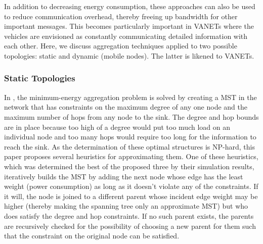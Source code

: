 \documentclass{IEEEtran}
\begin{document}
In addition to decreasing energy consumption, these approaches can also be used to reduce communication overhead, thereby freeing up bandwidth for other important messages.
This becomes particularly important in VANETs where the vehicles are envisioned as constantly communicating detailed information with each other.
Here, we discuss aggregation techniques applied to two possible topologies: static and dynamic (mobile nodes).  The latter is likened to VANETs.

\subsubsection{Static Topologies}

In \cite{heuristic}, the minimum-energy aggregation problem is solved by creating a MST in the network that has constraints on the maximum degree of any one node and the maximum number of hops from any node to the sink.  The degree and hop bounds are in place because too high of a degree would put too much load on an individual node and too many hops would require too long for the information to reach the sink.  As the determination of these optimal structures is NP-hard, this paper proposes several heuristics for approximating them.  One of these heuristics, which was determined the best of the proposed three by their simulation results, iteratively builds the MST by adding the next node whose edge has the least weight (power consumption) as long as it doesn’t violate any of the constraints.  If it will, the node is joined to a different parent whose incident edge weight may be higher (thereby making the spanning tree only an approximate MST) but who does satisfy the degree and hop constraints.  If no such parent exists, the parents are recursively checked for the possibility of choosing a new parent for them such that the constraint on the original node can be satisfied.
\end{document}
